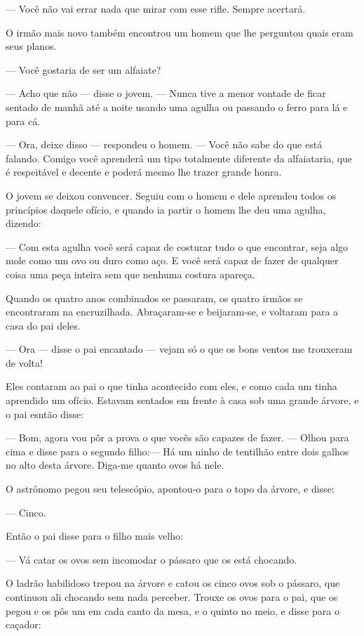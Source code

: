 — Você não vai errar nada que mirar com esse rifle. Sempre acertará.

O irmão mais novo também encontrou um homem que lhe perguntou quais
eram seus planos.

— Você gostaria de ser um alfaiate?

— Acho que não — disse o jovem. — Nunca tive a menor vontade de ficar
sentado de manhã até a noite usando uma agulha ou passando o ferro
para lá e para cá.

— Ora, deixe disso — respondeu o homem. — Você não sabe do que está
falando. Comigo você aprenderá um tipo totalmente diferente da
alfaiataria, que é respeitável e decente e poderá mesmo lhe trazer
grande honra.

O jovem se deixou convencer. Seguiu com o homem e dele aprendeu todos
os princípios daquele ofício, e quando ia partir o homem lhe deu uma
agulha, dizendo:

— Com esta agulha você será capaz de costurar tudo o que encontrar,
seja algo mole como um ovo ou duro como aço. E você será capaz de
fazer de qualquer coisa uma peça inteira sem que nenhuma costura
apareça.

Quando os quatro anos combinados se passaram, os quatro irmãos se
encontraram na encruzilhada. Abraçaram-se e beijaram-se, e voltaram
para a casa do pai deles.

— Ora — disse o pai encantado — vejam só o que os bons ventos me
trouxeram de volta!

Eles contaram ao pai o que tinha acontecido com eles, e como cada um
tinha aprendido um ofício. Estavam sentados em frente à casa sob uma
grande árvore, e o pai esntão disse:

— Bom, agora vou pôr a prova o que vocês são capazes de fazer. — Olhou
para cima e disse para o segundo filho:— Há um ninho de tentilhão
entre dois galhos no alto desta árvore. Diga-me quanto ovos há nele.

O astrônomo pegou seu telescópio, apontou-o para o topo da árvore, e
disse:

— Cinco.

Então o pai disse para o filho mais velho:

— Vá catar os ovos sem incomodar o pássaro que os está chocando.

O ladrão habilidoso trepou na árvore e catou os cinco ovos sob o
pássaro, que continuou ali chocando sem nada perceber. Trouxe os ovos
para o pai, que os pegou e os pôs um em cada canto da mesa, e o
quinto no meio, e disse para o caçador:

